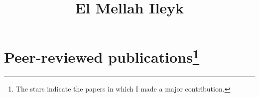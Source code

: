 
\renewcommand*\rmdefault{iwona}

\renewcommand \thesection{\colorulem[red]{\Roman{section}}}
\renewcommand \thesubsection{\Roman{section}.\colorulem[green]{\arabic{subsection}}}

\newcommand{\horrule}[1]{\rule{\linewidth}{#1}} %

\title{	
\vspace*{-2cm}
\normalfont \normalsize 
El Mellah Ileyk \\ [25pt] %
}
%
%
\date{} %




\maketitle
\thispagestyle{empty}
\vspace*{-3cm}
\section*{Peer-reviewed publications\footnote{The stars indicate the papers in which I made a major contribution.}}

